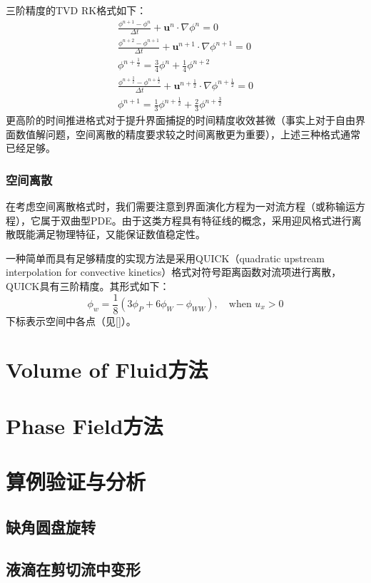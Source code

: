 \documentclass[10pt]{article}
\begin{document}
三阶精度的TVD RK格式如下：
\begin{eqnarray}
    \frac{\phi^{n+1}-\phi^n}{\Delta t}+\bm{u}^n\cdot\nabla\phi^n=0 \\
    \frac{\phi^{n+2}-\phi^{n+1}}{\Delta t}+\bm{u}^{n+1}\cdot\nabla\phi^{n+1}=0 \\
    \phi^{n+\frac{1}{2}}=\frac{3}{4}\phi^n+\frac{1}{4}\phi^{n+2} \\
    \frac{\phi^{n+\frac{3}{2}}-\phi^{n+\frac{1}{2}}}{\Delta t}+\bm{u}^{n+\frac{1}{2}}\cdot\nabla\phi^{n+\frac{1}{2}}=0 \\
    \phi^{n+1}=\frac{1}{3}\phi^{n+\frac{1}{2}}+\frac{2}{3}\phi^{n+\frac{3}{2}}
\end{eqnarray}
更高阶的时间推进格式对于提升界面捕捉的时间精度收效甚微（事实上对于自由界面数值解问题，空间离散的精度要求较之时间离散更为重要），上述三种格式通常已经足够。

\subsubsection{空间离散}
在考虑空间离散格式时，我们需要注意到界面演化方程为一对流方程（或称输运方程），它属于双曲型PDE。由于这类方程具有特征线的概念，采用迎风格式进行离散既能满足物理特征，又能保证数值稳定性。

一种简单而具有足够精度的实现方法是采用QUICK（quadratic upstream interpolation for convective kinetics）格式对符号距离函数对流项进行离散，QUICK具有三阶精度。其形式如下：
\begin{equation}
    \phi_w=\frac{1}{8}\left(3\phi_P+6\phi_{W}-\phi_{WW}\right),\quad \text{when }u_x>0
\end{equation}
下标表示空间中各点（见\autoref{}）。


\newpage
\section{Volume of Fluid方法}

\newpage
\section{Phase Field方法}

\newpage
\section{算例验证与分析}
\subsection{缺角圆盘旋转}

\subsection{液滴在剪切流中变形}



\end{document}
